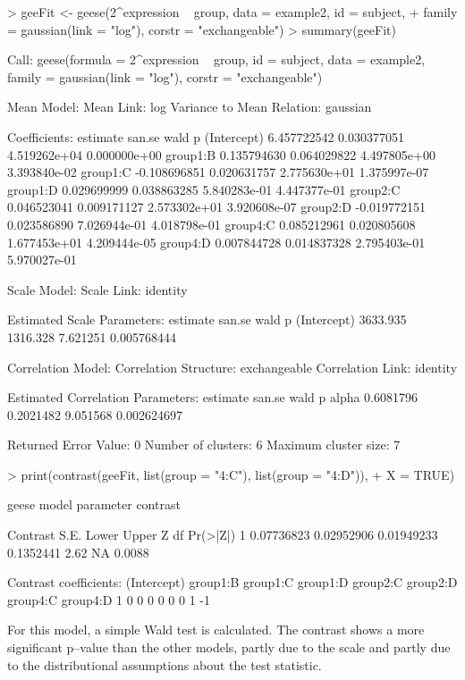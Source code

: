 \documentclass[12pt]{article}
\begin{document}
{\small
\begin{Schunk}
\begin{Sinput}
> geeFit <- geese(2^expression ~ group, data = example2, id = subject, 
+     family = gaussian(link = "log"), corstr = "exchangeable")
> summary(geeFit)
\end{Sinput}
\begin{Soutput}
Call:
geese(formula = 2^expression ~ group, id = subject, data = example2, 
    family = gaussian(link = "log"), corstr = "exchangeable")

Mean Model:
 Mean Link:                 log 
 Variance to Mean Relation: gaussian 

 Coefficients:
                estimate      san.se         wald            p
(Intercept)  6.457722542 0.030377051 4.519262e+04 0.000000e+00
group1:B     0.135794630 0.064029822 4.497805e+00 3.393840e-02
group1:C    -0.108696851 0.020631757 2.775630e+01 1.375997e-07
group1:D     0.029699999 0.038863285 5.840283e-01 4.447377e-01
group2:C     0.046523041 0.009171127 2.573302e+01 3.920608e-07
group2:D    -0.019772151 0.023586890 7.026944e-01 4.018798e-01
group4:C     0.085212961 0.020805608 1.677453e+01 4.209444e-05
group4:D     0.007844728 0.014837328 2.795403e-01 5.970027e-01

Scale Model:
 Scale Link:                identity 

 Estimated Scale Parameters:
            estimate   san.se     wald           p
(Intercept) 3633.935 1316.328 7.621251 0.005768444

Correlation Model:
 Correlation Structure:     exchangeable 
 Correlation Link:          identity 

 Estimated Correlation Parameters:
       estimate    san.se     wald           p
alpha 0.6081796 0.2021482 9.051568 0.002624697

Returned Error Value:    0 
Number of clusters:   6   Maximum cluster size: 7 
\end{Soutput}
\begin{Sinput}
> print(contrast(geeFit, list(group = "4:C"), list(group = "4:D")), 
+     X = TRUE)
\end{Sinput}
\begin{Soutput}
geese model parameter contrast

    Contrast       S.E.      Lower     Upper    Z df Pr(>|Z|)
1 0.07736823 0.02952906 0.01949233 0.1352441 2.62 NA   0.0088

Contrast coefficients:
  (Intercept) group1:B group1:C group1:D group2:C group2:D group4:C group4:D
1           0        0        0        0        0        0        1       -1
\end{Soutput}
\end{Schunk}
}      
For this model, a simple Wald test is calculated. The contrast shows a more significant p--value than the other models, partly due to the scale and partly due to the distributional assumptions about the test statistic.
\end{document}
